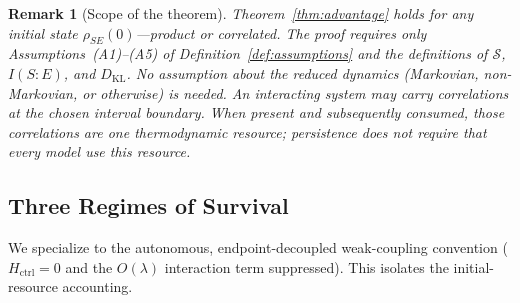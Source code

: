 \documentclass[12pt]{article}
\newtheorem{remark}[theorem]{Remark}
\begin{document}
\begin{remark}[Scope of the theorem]
\label{rem:no_product}
Theorem~\ref{thm:advantage} holds for \emph{any} initial
state $\rho_{SE}(0)$---product or correlated.
The proof requires only
Assumptions~\textup{(A1)--(A5)} of
Definition~\ref{def:assumptions} and the definitions of
$\mathcal{S}$, $I(S{:}E)$, and $D_{\mathrm{KL}}$.
No assumption about the reduced dynamics (Markovian,
non-Markovian, or otherwise) is needed.
An interacting system may carry correlations at the chosen interval
boundary.  When present and subsequently consumed, those correlations
are one thermodynamic resource; persistence does not require that every
model use this resource.
\end{remark}

\subsection{Three Regimes of Survival}

We specialize to the autonomous, endpoint-decoupled weak-coupling
convention ($H_{\mathrm{ctrl}} = 0$ and the $O(\lambda)$ interaction
term suppressed).  This isolates the initial-resource accounting.
\end{document}
